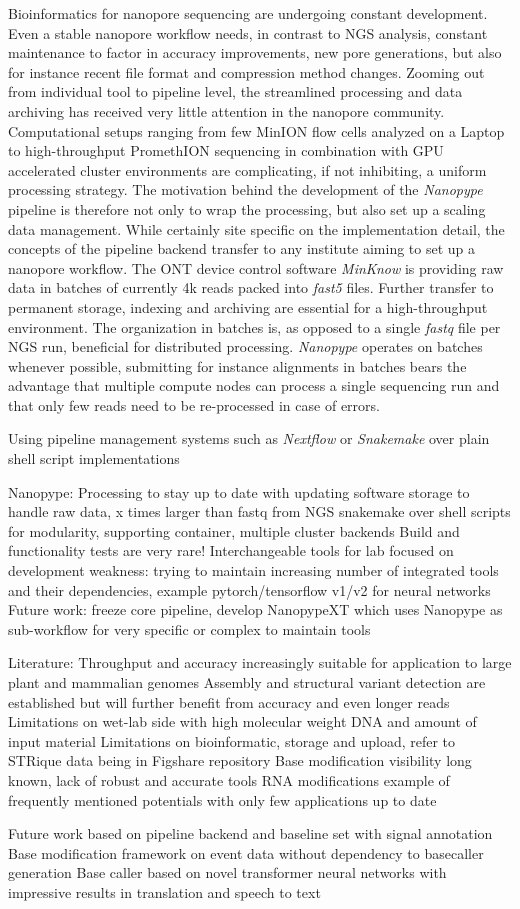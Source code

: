 Bioinformatics for nanopore sequencing are undergoing constant development.
Even a stable nanopore workflow needs, in contrast to NGS analysis, constant maintenance to factor in accuracy improvements, new pore generations, but also for instance recent file format and compression method changes.
Zooming out from individual tool to pipeline level, the streamlined processing and data archiving has received very little attention in the nanopore community.
Computational setups ranging from few MinION flow cells analyzed on a Laptop to high-throughput PromethION sequencing in combination with GPU accelerated cluster environments are complicating, if not inhibiting, a uniform processing strategy.
The motivation behind the development of the \textit{Nanopype} pipeline is therefore not only to wrap the processing, but also set up a scaling data management.
While certainly site specific on the implementation detail, the concepts of the pipeline backend transfer to any institute aiming to set up a nanopore workflow.
The ONT device control software \textit{MinKnow} is providing raw data in batches of currently 4k reads packed into \textit{fast5} files.
Further transfer to permanent storage, indexing and archiving are essential for a high-throughput environment.
The organization in batches is, as opposed to a single \textit{fastq} file per NGS run, beneficial for distributed processing.
\textit{Nanopype} operates on batches whenever possible, submitting for instance alignments in batches bears the advantage that multiple compute nodes can process a single sequencing run and that only few reads need to be re-processed in case of errors.

Using pipeline management systems such as \textit{Nextflow} or \textit{Snakemake} over plain shell script implementations


Nanopype: Processing to stay up to date with updating software
storage to handle raw data, x times larger than fastq from NGS
snakemake over shell scripts for modularity, supporting container, multiple cluster backends
Build and functionality tests are very rare!
Interchangeable tools for lab focused on development
weakness: trying to maintain increasing number of integrated tools and their dependencies, example pytorch/tensorflow v1/v2 for neural networks
Future work: freeze core pipeline, develop NanopypeXT which uses Nanopype as sub-workflow for very specific or complex to maintain tools

Literature: Throughput and accuracy increasingly suitable for application to large plant and mammalian genomes
Assembly and structural variant detection are established but will further benefit from accuracy and even longer reads
Limitations on wet-lab side with high molecular weight DNA and amount of input material
Limitations on bioinformatic, storage and upload, refer to STRique data being in Figshare repository
Base modification visibility long known, lack of robust and accurate tools
RNA modifications example of frequently mentioned potentials with only few applications up to date

Future work based on pipeline backend and baseline set with signal annotation
Base modification framework on event data without dependency to basecaller generation
Base caller based on novel transformer neural networks with impressive results in translation and speech to text







